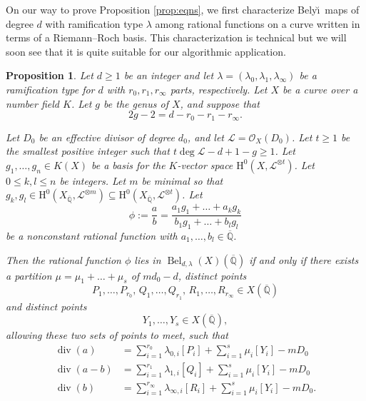 \documentclass{amsproc}
\numberwithin{equation}{section}
\numberwithin{figure}{section}
\newtheorem{proposition}[equation]{Proposition}
\theoremstyle{definition}
\theoremstyle{remark}
\DeclareMathOperator{\opdiv}{div}
\newcommand{\Qbar}{\overline{\mathbb{Q}}}
\newcommand{\scrL}{\mathscr{L}}
\newcommand\scrO{\mathscr{O}}
\DeclareMathOperator{\Bel}{Bel}
\renewcommand{\leq}{\leqslant}
\renewcommand{\geq}{\geqslant}
\newcommand{\Belyi}{Bely\u{\i}}
\begin{document}
On our way to prove Proposition \ref{prop:eqns}, we first characterize \Belyi\ maps of degree $d$ with ramification type $\lambda$ among rational functions on a curve written in terms of a Riemann--Roch basis.  This characterization is technical but we will soon see that it is quite suitable for our algorithmic application.
 
\begin{proposition} \label{prop:claim}   Let $d\geq 1$ be an integer and let $\lambda=(\lambda_0,\lambda_1,\lambda_\infty)$ be a ramification type for $d$ with $r_0,r_1,r_\infty$ parts, respectively.  Let $X$ be a curve  over  a number field $K$.  Let $g$ be the genus of $X$, and suppose that 
\begin{equation} \label{eqn:2g2dr}
2g-2=d-r_0-r_1-r_\infty.
\end{equation}

Let $D_0$ be an effective divisor of degree $d_0$, and let $\scrL = \scrO_X(D_0)$.  Let $t\geq 1$ be the smallest positive integer such that $t \deg \scrL - d+1-g \geq 1$. Let $g_1,\ldots,g_n \in K(X)$  be a basis for the $K$-vector space  $\mathrm{H}^0(X,\scrL^{\otimes t})$. 
Let $0\leq k, l \leq n$ be integers. Let $m$ be minimal so that $g_k, g_l\in \mathrm{H}^0(X_{\overline{\mathbb{Q}}}, \scrL^{\otimes m}) \subseteq \mathrm{H}^0(X_{\overline{\mathbb{Q}}},\scrL^{\otimes t})$.
Let $$\phi:= \frac{a}{b} =  \frac{a_1 g_1+\ldots +a_k g_k}{ b_1 g_1 +\ldots + b_l g_l } $$ be a nonconstant rational function with $a_1,\dots,b_l \in \Qbar$.

Then the rational function $\phi$ lies in $\Bel_{d,\lambda}(X)(\Qbar)$ if and only if there exists a partition $\mu=\mu_1+\dots+\mu_s$ of $md_0 -d$,  distinct points
\[ P_{1},\dots,P_{r_0},\,Q_{1},\dots,Q_{r_1},\,R_{1},\dots,R_{r_\infty} \in X(\Qbar) \]
and distinct points 
\[ Y_1,\dots,Y_s \in X(\Qbar), \]
allowing these two sets of points to meet, such that
\begin{equation} \label{bel}
\begin{aligned}
\opdiv(a) & = \sum_{i=1}^{r_0} \lambda_{0,i}[P_i] + \sum_{i=1}^{s} \mu_i [Y_i] - mD_0 \\
\opdiv(a-b) & = \sum_{i=1}^{r_1} \lambda_{1,i}[Q_i] + \sum_{i=1}^{s} \mu_i [Y_i] - mD_0 \\
\opdiv(b) & = \sum_{i=1}^{r_\infty} \lambda_{\infty,i}[R_i] + \sum_{i=1}^{s} \mu_i [Y_i] - mD_0.
\end{aligned}
\end{equation}
\end{proposition}
\end{document}

